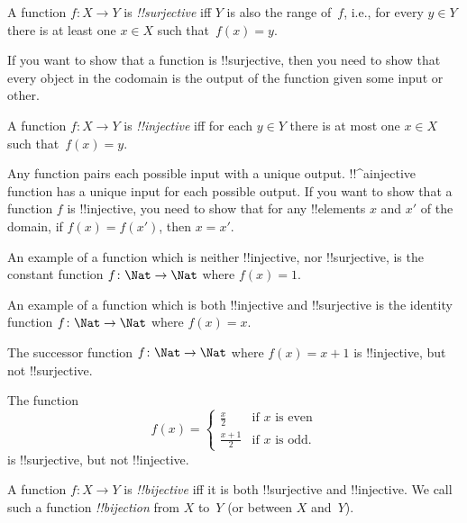\documentclass[../../../include/open-logic-section]{subfiles}
\begin{document}

\begin{defn}
A function $f \colon X \rightarrow Y$ is \emph{!!{surjective}} iff $Y$
is also the range of~$f$, i.e., for every $y \in Y$ there is at least
one $x \in X$ such that~$f(x) = y$.
\end{defn}

\begin{explain}
If you want to show that a function is !!{surjective}, then you need
to show that every object in the codomain is the output of the
function given some input or other.
\end{explain}

\begin{defn}
A function $f \colon X \rightarrow Y$ is \emph{!!{injective}} iff for
each $y \in Y$ there is at most one $x \in X$ such that~$f(x) = y$.
\end{defn}

\begin{explain}
Any function pairs each possible input with a unique output. !!^a{injective}
function has a unique input for each possible output. If you want to
show that a function $f$ is !!{injective}, you need to show that for
any !!{element}s $x$ and $x'$ of the domain, if $f(x)=f(x')$, then $x=x'$.

An example of a function which is neither !!{injective}, nor !!{surjective}, is the
constant function $f\colon \Nat \rightarrow \Nat$ where $f(x) = 1$.

An example of a function which is both !!{injective} and !!{surjective} is the
identity function $f\colon \Nat \rightarrow \Nat$ where $f(x) = x$.

The successor function $f \colon \Nat \rightarrow \Nat$ where $f(x) =
x+1$ is !!{injective}, but not !!{surjective}.

The function
\[
f(x) =
\begin{cases}
  \frac{x}{2} & \text{if $x$ is even} \\
  \frac{x+1}{2} & \text{if $x$ is odd.}
\end{cases}
\]
is !!{surjective}, but not !!{injective}.
\end{explain}

\begin{defn}[!!^{bijection}]
A function $f \colon X \to Y$ is \emph{!!{bijective}} iff it is both
!!{surjective} and !!{injective}.  We call such a function
 \emph{!!{bijection}} from $X$ to~$Y$ (or between
$X$ and~$Y$).
\end{defn}
\end{document}

